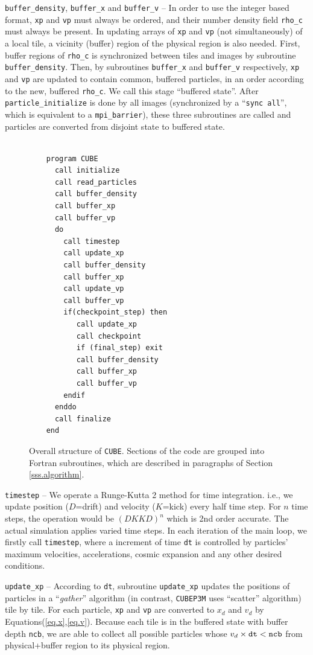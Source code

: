 \documentclass[10pt,twocolumn,preprint]{emulateapj}
\begin{document}
{\tt buffer\_density}, {\tt buffer\_x} and {\tt buffer\_v} -- In order to use the integer based format, {\tt xp} and {\tt vp} must always be ordered, and their number density field {\tt rho\_c} must always be present. In updating arrays of {\tt xp} and {\tt vp} (not simultaneously) of a local tile, a vicinity (buffer) region of the physical region is also needed. First, buffer regions of {\tt rho\_c} is synchronized between tiles and images by subroutine {\tt buffer\_density}. Then, by subroutines {\tt buffer\_x} and {\tt buffer\_v} respectively, {\tt xp} and {\tt vp} are updated to contain common, buffered particles, in an order according to the new, buffered {\tt rho\_c}. We call this stage ``buffered state''. After {\tt particle\_initialize} is done by all images (synchronized by a ``{\tt sync all}'', which is equivalent to a {\tt mpi\_barrier}), these three subroutines are called and particles are converted from disjoint state to buffered state.

\begin{figure}[t]
\begin{verbatim}

    program CUBE
      call initialize
      call read_particles
      call buffer_density
      call buffer_xp
      call buffer_vp
      do
        call timestep
        call update_xp
        call buffer_density
        call buffer_xp
        call update_vp
        call buffer_vp
        if(checkpoint_step) then
           call update_xp
           call checkpoint
           if (final_step) exit
           call buffer_density
           call buffer_xp
           call buffer_vp
        endif
      enddo
      call finalize
    end
\end{verbatim}
\caption{Overall structure of {\tt CUBE}. Sections of the code are grouped into Fortran subroutines, which are described in paragraphs of Section \ref{sss.algorithm}.}
\label{fig.code}
\end{figure}


{\tt timestep} --
We operate a Runge-Kutta 2 method for time integration. i.e., we update position ($D$=drift) and velocity ($K$=kick) every half time step. For $n$ time steps, the operation would be $(DKKD)^n$ which is 2nd order accurate. The actual simulation applies varied time steps. In each iteration of the main loop, we firstly call {\tt timestep}, where a increment of time {\tt dt} is controlled by particles' maximum velocities, accelerations, cosmic expansion and any other desired conditions.

{\tt update\_xp} --
According to {\tt dt}, subroutine {\tt update\_xp} updates the positions of particles in a ``{\it gather}'' algorithm (in contrast, {\tt CUBEP3M} uses ``scatter'' algorithm) tile by tile. For each particle, {\tt xp} and {\tt vp} are converted to $x_d$ and $v_d$ by Equations(\ref{eq.x},\ref{eq.v}). Because each tile is in the buffered state with buffer depth {\tt ncb}, we are able to collect all possible particles whose $v_d\times{\tt dt}<{\tt ncb}$ from physical+buffer region to its physical region.
\end{document}
